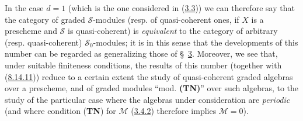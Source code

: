 \begin{remark}[8.14.12]
In the case $d=1$ (which is the one considered in
(\hyperref[subsection:II.3.3]{3.3})) we can therefore say that the category
of graded $\mathcal{S}$-modules (resp. of quasi-coherent ones, if $X$ is a
prescheme and $\mathcal{S}$ is quasi-coherent) is \emph{equivalent} to the
category of arbitrary (resp. quasi-coherent) $\mathcal{S}_0$-modules; it is in
this sense that the developments of this number can be regarded as
generalizing those of \S~\hyperref[section:II.3]{3}. Moreover, we see that,
under suitable finiteness conditions, the results of this number
(together with (\hyperref[II.8.14.11]{8.14.11})) reduce to a certain
extent the study of quasi-coherent graded algebras over a prescheme, and of
graded modules ``mod. \textbf{(TN)}'' over such algebras, to the study of the
particular case where the algebras under consideration are \emph{periodic}
(and where condition (\textbf{TN}) for $\mathcal{M}$
(\hyperref[II.3.4.2]{3.4.2}) therefore implies $\mathcal{M}=0$).
\end{remark}

